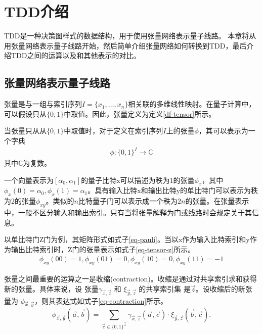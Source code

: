 \chapter{TDD介绍}
TDD是一种决策图样式的数据结构，用于使用张量网络表示量子线路。
本章将从用张量网络表示量子线路开始，然后简单介绍张量网络如何转换到TDD，最后介绍TDD之间的运算以及和其他表示的对比。
\section{张量网络表示量子线路}
张量是与一组与索引序列\(I=\{x_1,\ldots,x_n\}\)相关联的多维线性映射。在量子计算中，可以假设只从\(\{0,1\}\)中取值。因此，张量定义为定义\ref{df-tensor}所示。
\begin{definition}
    \label{df-tensor}
    当张量只从从\(\{0,1\}\)中取值时，对于定义在索引序列\(I\)上的张量\(\phi\)，其可以表示为一个字典
    \begin{align}
        \phi :{\{0,1\}}^I\rightarrow\mathbb{C}
    \end{align}
    其中\(\mathbb{C}\)为复数。
\end{definition}


一个向量表示为$[\alpha_0,\alpha_1]$的量子比特x可以描述为秩为1的张量$\phi_x$，其中$\phi_x\left(0\right)=\alpha_0, \phi_x\left(1\right)=\alpha_1$。具有输入比特x和输出比特y的单比特门可以表示为秩为2的张量$\phi_{xy}$。类似的$n$比特量子门可以表示成一个秩为$2n$的张量。在张量表示中，一般不区分输入和输出索引。只有当将张量解释为门或线路时会规定关于其信息。
\begin{example}
    以单比特门Z门为例，其矩阵形式如式子\ref{eq-pauli}。当以x作为输入比特索引和y作为输出比特索引时，Z门的张量表示如式子\ref{eq-tensor-z}所示。
    \begin{align}
        \label{eq-tensor-z}
        \phi_{xy}\left(00\right)=1,\phi_{xy}\left(01\right)=0,\phi_{xy}\left(10\right)=0,\phi_{xy}\left(11\right)=-1
    \end{align}
\end{example}

张量之间最重要的运算之一是收缩(contraction)。收缩是通过对共享索引求和获得新的张量。具体来说，设 张量$\gamma_{\overrightarrow{x},\overrightarrow{z}}$ 和 $\xi_{\overrightarrow{y},\overrightarrow{z}}$ 的共享索引集 是$\overrightarrow{z}$。设收缩后的新张量为 $\phi_{\overrightarrow{x},\overrightarrow{y}}$，则其表达式如式子\ref{eq-contraction}所示。
\begin{equation}
\label{eq-contraction}
\phi_{\overrightarrow{x},\overrightarrow{y}}(\overrightarrow{a},\overrightarrow{b}) = \sum_{\overrightarrow{c} \in \{0,1\}^{\overrightarrow{z}}} \gamma_{\overrightarrow{x},\overrightarrow{z}}(\overrightarrow{a}, \overrightarrow{c}) \cdot \xi_{\overrightarrow{y},\overrightarrow{z}}(\overrightarrow{b}, \overrightarrow{c}).
\end{equation}

